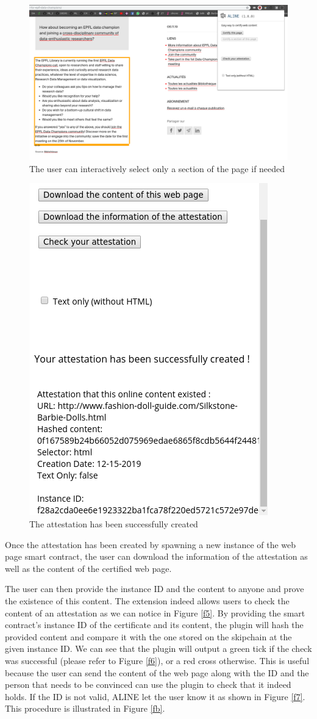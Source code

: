 \begin{figure}[H]
    \centering
    \includegraphics[width=1\linewidth, frame]{images/selector_gadget.png}
    \caption{The user can interactively select only a section of the page if needed}
    \label{f3}
\end{figure}

\begin{figure}[H]
    \centering
    \includegraphics[width=0.4\linewidth, frame]{images/attest_successfully_created.png}
    \caption{The attestation has been successfully created}
    \label{f4}
\end{figure}

Once the attestation has been created by spawning a new instance of the web page smart contract, the user can download the information of the attestation as well as the content of the certified web page.

The user can then provide the instance ID and the content to anyone and prove the existence of this content. The extension indeed allows users to check the content of an attestation as we can notice in Figure \ref{f5}. By providing the smart contract's instance ID of the certificate and its content, the plugin will hash the provided content and compare it with the one stored on the skipchain at the given instance ID. We can see that the plugin will output a green tick if the check was successful (please refer to Figure \ref{f6}), or a red cross otherwise. This is useful because the user can send the content of the web page along with the ID and the person that needs to be convinced can use the plugin to check that it indeed holds. If the ID is not valid, ALINE let the user know it as shown in Figure \ref{f7}. This procedure is illustrated in Figure \ref{fb}.

